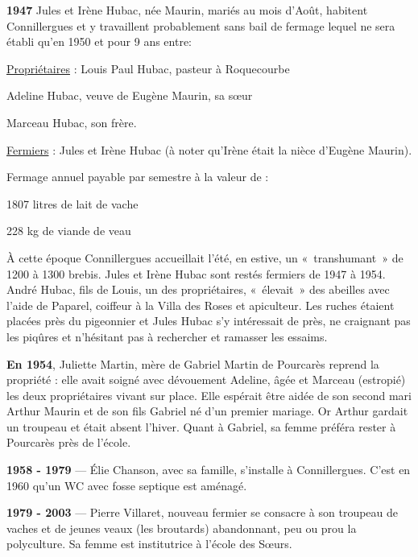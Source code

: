 \textbf{1947} Jules et Irène Hubac, née Maurin, mariés au mois d’Août, habitent Connillergues et y
travaillent probablement sans bail de fermage lequel ne sera établi qu’en 1950 et pour 9 ans
entre:

\uline{Propriétaires} : Louis Paul Hubac, pasteur à Roquecourbe

\hspace{3.5cm} Adeline Hubac, veuve de Eugène Maurin, sa sœur

\hspace{3.5cm} Marceau Hubac, son frère.

\uline{Fermiers} : Jules et Irène Hubac (à noter qu’Irène était la nièce d’Eugène Maurin).

\vspace{0.2cm}

Fermage annuel payable par semestre à la valeur de :

\hspace{3.5cm} 1807 litres de lait de vache

\hspace{3.5cm} 228 kg de viande de veau

À cette époque Connillergues accueillait l’été, en estive, un «~transhumant~» de 1200 à 1300
brebis. Jules et Irène Hubac sont restés fermiers de 1947 à 1954.
André Hubac, fils de Louis, un des propriétaires, «~élevait~» des abeilles avec l’aide de
Paparel, coiffeur à la Villa des Roses et apiculteur. Les ruches étaient placées près du
pigeonnier et Jules Hubac s’y intéressait de près, ne craignant pas les piqûres et n’hésitant pas
à rechercher et ramasser les essaims.

\textbf{En 1954}, Juliette Martin, mère de Gabriel Martin de Pourcarès reprend la propriété : elle avait
soigné avec dévouement Adeline, âgée et Marceau (estropié) les deux propriétaires vivant sur
place. Elle espérait être aidée de son second mari Arthur Maurin et de son fils Gabriel né
d’un premier mariage. Or Arthur gardait un troupeau et était absent l’hiver. Quant à Gabriel,
sa femme préféra rester à Pourcarès près de l’école.

\textbf{1958 - 1979} --- Élie Chanson, avec sa famille, s’installe à Connillergues. C’est en 1960 qu’un
WC avec fosse septique est aménagé.

\textbf{1979 - 2003} --- Pierre Villaret, nouveau fermier se consacre à son troupeau de vaches et de
jeunes veaux (les broutards) abandonnant, peu ou prou la polyculture.
Sa femme est institutrice à l’école des Sœurs.

